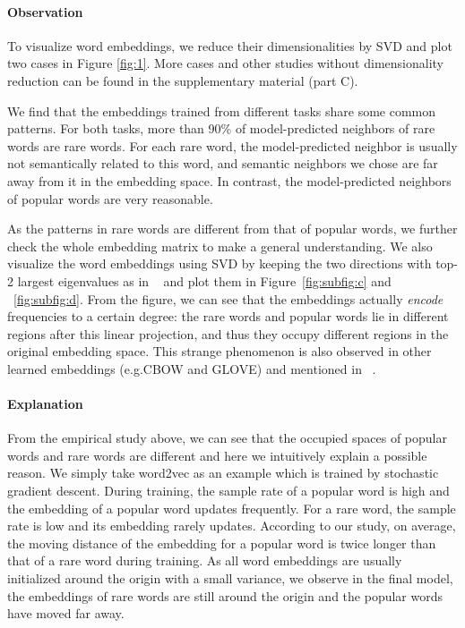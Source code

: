 \documentclass{article}
\begin{document}
\paragraph{Observation} To visualize word embeddings, we reduce their dimensionalities by SVD and plot two cases in Figure \ref{fig:1}. More cases and other studies without dimensionality reduction can be found in the supplementary material (part C).

We find that the embeddings trained from different tasks share some common patterns. For both tasks, more than 90\% of model-predicted neighbors of rare words are rare words. For each rare word, the model-predicted neighbor is usually not semantically related to this word, and semantic neighbors we chose are far away from it in the embedding space. In contrast, the model-predicted neighbors of popular words are very reasonable.

As the patterns in rare words are different from that of popular words, we further check the whole embedding matrix to make a general understanding. We also visualize the word embeddings using SVD by keeping the two directions with top-2 largest eigenvalues as in ~\cite{mikolov2013distributed,DBLP:journals/corr/MuBV17} and plot them in Figure~\ref{fig:subfig:c} and ~\ref{fig:subfig:d}. From the figure, we can see that the embeddings actually \emph{encode} frequencies to a certain degree: the rare words and popular words lie in different regions after this linear projection, and thus they occupy different regions in the original embedding space. This strange phenomenon is also observed in other learned embeddings (e.g.CBOW and GLOVE) and mentioned in ~\cite{DBLP:journals/corr/MuBV17}.

\paragraph{Explanation} From the empirical study above, we can see that the occupied spaces of popular words and rare words are different and here we intuitively explain a possible reason. We simply take word2vec as an example which is trained by stochastic gradient descent. During training, the sample rate of a popular word is high and the embedding of a popular word updates frequently. For a rare word, the sample rate is low and its embedding rarely updates. According to our study, on average, the moving distance of the embedding for a popular word is twice longer than that of a rare word during training. As all word embeddings are usually initialized around the origin with a small variance, we observe in the final model, the embeddings of rare words are still around the origin and the popular words have moved far away.
\end{document}
